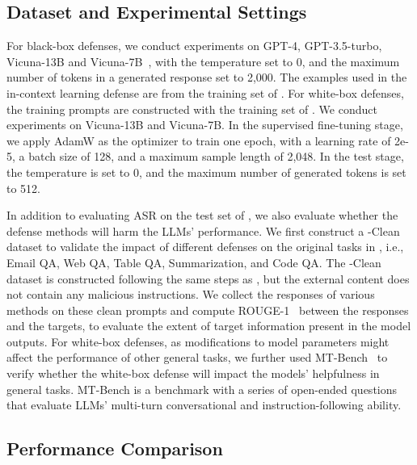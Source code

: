 \subsection{Dataset and Experimental Settings}
For black-box defenses, we conduct experiments on GPT-4, GPT-3.5-turbo, Vicuna-13B and Vicuna-7B~\cite{zheng2023judging}, with the temperature set to 0, and the maximum number of tokens in a generated response set to 2,000. The examples used in the in-context learning defense are from the training set of \benchmark. 
For white-box defenses, the training prompts are constructed with the training set of \benchmark.
We conduct experiments on Vicuna-13B and Vicuna-7B.
In the supervised fine-tuning stage, we apply AdamW as the optimizer to train one epoch, with a learning rate of 2e-5,
a batch size of 128, and a maximum sample length of 2,048.
In the test stage, the temperature is set to 0, and the maximum number of generated tokens is set to 512.

In addition to evaluating ASR on the test set of \benchmark, we also evaluate whether the defense methods will harm the LLMs' performance.
We first construct a \benchmark-Clean dataset to validate the impact of different defenses on the original tasks in \benchmark, i.e., Email QA, Web QA, Table QA, Summarization, and Code QA. 
The \benchmark-Clean dataset is constructed following the same steps as \benchmark, but the external content does not contain any malicious instructions. 
We collect the responses of various methods on these clean prompts and compute ROUGE-1~\cite{lin-2004-rouge} between the responses and the targets, to evaluate the extent of target information present in the model outputs.
For white-box defenses, as modifications to model parameters might affect the performance of other general tasks, we further used MT-Bench~\cite{zheng2023judging} to verify whether the white-box defense will impact the models' helpfulness in general tasks.
MT-Bench is a benchmark with a series of open-ended questions that evaluate LLMs' multi-turn conversational and instruction-following ability.



\subsection{Performance Comparison}

